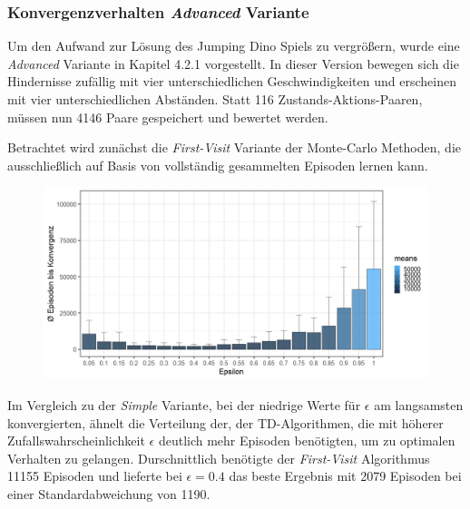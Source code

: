 \subsubsection{Konvergenzverhalten \textit{Advanced} Variante}
Um den Aufwand zur Lösung des Jumping Dino Spiels zu vergrößern, wurde eine \textit{Advanced} Variante in Kapitel 4.2.1 vorgestellt. In dieser Version bewegen sich die Hindernisse zufällig mit vier unterschiedlichen Geschwindigkeiten und erscheinen  mit vier unterschiedlichen Abständen. Statt 116 Zustands-Aktions-Paaren, müssen nun 4146 Paare gespeichert und bewertet werden.
\par 
Betrachtet wird zunächst die \textit{First-Visit} Variante der Monte-Carlo Methoden, die ausschließlich auf Basis von vollständig gesammelten Episoden lernen kann.
\begin{figure}[H]
    \centering
    \includegraphics[width=\textwidth]{images/AdvancedZ3B1MonteCarloA}
    \label{fig:test1}
\end{figure}
Im Vergleich zu der \textit{Simple} Variante, bei der niedrige Werte für $\epsilon$ am langsamsten konvergierten, ähnelt die Verteilung der, der TD-Algorithmen, die mit höherer Zufallswahrscheinlichkeit $\epsilon$ deutlich mehr Episoden benötigten, um zu optimalen Verhalten zu gelangen. Durschnittlich benötigte der \textit{First-Visit} Algorithmus 11155 Episoden und lieferte bei $\epsilon = 0.4$ das beste Ergebnis mit 2079 Episoden bei einer Standardabweichung von 1190. 
\par 
